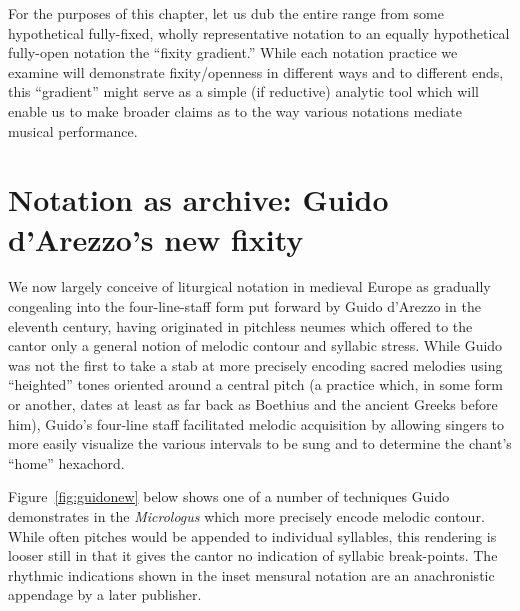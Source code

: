 
    For the purposes of this chapter, let us dub the entire range from some hypothetical fully-fixed, wholly representative notation to an equally hypothetical fully-open notation the ``fixity gradient.'' While each notation practice we examine will demonstrate fixity/openness in different ways and to different ends, this ``gradient'' might serve as a simple (if reductive) analytic tool which will enable us to make broader claims as to the way various notations mediate musical performance.

    \section{Notation as archive: Guido d'Arezzo's new fixity}

    We now largely conceive of liturgical notation in medieval Europe as gradually congealing into the four-line-staff form put forward by Guido d'Arezzo in the eleventh century, having originated in pitchless neumes which offered to the cantor only a general notion of melodic contour and syllabic stress.\autocite[16]{Taruskin_2009} While Guido was not the first to take a stab at more precisely encoding sacred melodies using ``heighted'' tones oriented around a central pitch (a practice which, in some form or another, dates at least as far back as Boethius and the ancient Greeks before him\autocite[17]{Taruskin_2009}), Guido's four-line staff facilitated melodic acquisition by allowing singers to more easily visualize the various intervals to be sung and to determine the chant's ``home'' hexachord.\autocite[53]{Reisenweaver_2012}

    Figure~\ref{fig:guidonew} below shows one of a number of techniques Guido demonstrates in the \textit{Micrologus} which more precisely encode melodic contour. While often pitches would be appended to individual syllables, this rendering is looser still in that it gives the cantor no indication of syllabic break-points. The rhythmic indications shown in the inset mensural notation are an anachronistic appendage by a later publisher.

